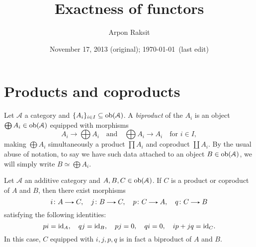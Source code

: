 


\title{Exactness of functors}
\author{Arpon Raksit}
\date{November 17, 2013 (original); \today\ (last edit)}


\maketitle
\thispagestyle{fancy}


\renewcommand{\A}{\mathcal{A}}
\renewcommand{\B}{\mathcal{B}}


\section{Products and coproducts}

\begin{definition}
  \label{biproduct}
  Let $\A$ a category and $\{A_i\}_{i \in I} \subseteq \ob(\A)$. A
  \emph{biproduct} of the $A_i$ is an object $\bigoplus A_i \in
  \ob(\A)$ equipped with morphisms
  \[
  \textstyle{A_i \to \bigoplus A_i \quad\text{and}\quad \bigoplus A_i
    \to A_i \quad \text{for }i \in I,}
  \]
  making $\bigoplus A_i$ simultaneously a product $\prod A_i$ and
  coproduct $\coprod A_i$. By the usual abuse of notation, to say we
  have such data attached to an object $B \in \ob(\A)$, we will simply
  write $B \simeq \bigoplus A_i$.
\end{definition}

\begin{lemma}
  \label{biproduct-formulae}
  Let $\A$ an additive category and $A,B,C \in \ob(\A)$. If $C$ is a
  product or coproduct of $A$ and $B$, then there exist morphisms
  \[
  i \c A \to C, \quad j \c B \to C, \quad p \c C \to A, \quad q \c C \to B
  \]
  satisfying the following identities:
  \[
  pi = \mathrm{id}_A, \quad qj = \mathrm{id}_B, \quad pj = 0, \quad qi = 0, \quad
  ip+jq = \mathrm{id}_C.
  \]
  In this case, $C$ equipped with $i,j,p,q$ is in fact a biproduct of
  $A$ and $B$.
\end{lemma}

